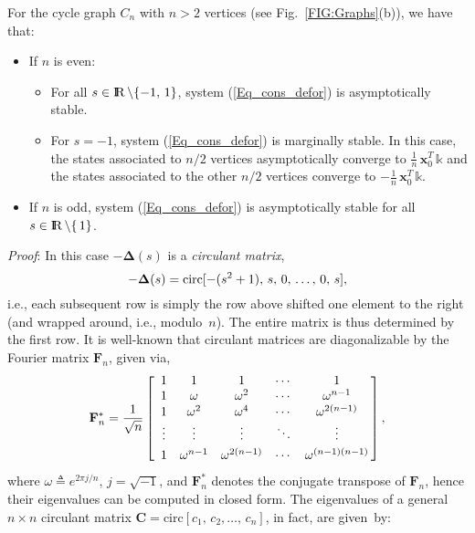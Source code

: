 \documentclass[letterpaper,9pt,twocolumn]{autart}
\newcommand{\rr}{\mathop{{\rm I}\mskip-4.0mu{\rm R}}\nolimits}
\newcommand{\vet}[1]{\ensuremath{{\mathbf #1}}}
\begin{document}
\begin{proposition}\label{Prop_Cycle}
For the cycle graph $C_n$ with $n > 2$ vertices (see Fig.~\ref{FIG:Graphs}(b)), we have that:
\begin{itemize}
\item If $n$ is even:
\begin{itemize}
\item For all $s \in \rr \setminus \{-1,\,1\}$, system (\ref{Eq_cons_defor}) is asymptotically stable.
\item For $s = -1$, system (\ref{Eq_cons_defor}) is marginally stable.
In this case, the states associated to $n/2$ vertices asymptotically
converge to $\frac{1}{n}\,\vet{x}_0^T\,\mathds{k}$
and the states associated to the other $n/2$ vertices converge to $-\frac{1}{n}\,\vet{x}_0^T\,\mathds{k}$.
\end{itemize}
\item If $n$ is odd, system (\ref{Eq_cons_defor}) is asymptotically stable for all $s \in \rr \setminus \{\,1\}$.
\end{itemize}
\emph{Proof}:
In this case $-\boldsymbol{\Delta}(s)$ is a \emph{circulant matrix}, $$
-\boldsymbol{\Delta}(s) = \textup{circ}[-(s^2 +1),\,s,\,0,\,\ldots,\,0,\,s],
$$
i.e., each subsequent row is simply the row above shifted one element
to the right (and wrapped around, i.e., modulo~$n$). The entire matrix is thus determined by the first row.
It is well-known that circulant matrices are diagonalizable by the Fourier matrix $\vet{F}_n$, given via,
$$
\vet{F}^{\ast}_n = \frac{1}{\sqrt{n}}\left[
  \begin{array}{ccccc}
    1 & 1 & 1 & \cdots & 1 \\
    1 & \omega & \omega^2 & \cdots & \omega^{n-1} \\
    1 & \omega^2 & \omega^4 & \cdots & \omega^{2(n-1)} \\
    \vdots & \vdots & \vdots & \ddots & \vdots\vspace{0.1cm}\\
    1 & \omega^{n-1} & \omega^{2(n-1)} & \cdots & \omega^{(n-1)(n-1)}\\
  \end{array}
\!\!\right],
$$
where $\omega \triangleq e^{2\pi j/n}$, $j = \sqrt{-1}$, and $\vet{F}^{\ast}_n$
denotes the conjugate transpose of $\vet{F}_n$,
hence their eigenvalues can be computed in closed form.
The eigenvalues of a general $n \times n$ circulant matrix
$\vet{C} = \text{circ}[c_1,\,c_2,\ldots,\,c_n]$, in fact,
are given~by:
\begin{equation}\label{Eq:Eig_circ}

\end{equation}
\end{proposition}
\end{document}
